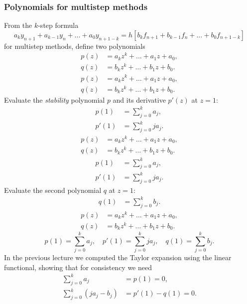 \documentclass{beamer}
\begin{document}
\begin{frame}
  \frametitle{Polynomials for multistep methods}

  \begin{overlayarea}{\textwidth}{0.9\textheight}
    {
      From the $k$-step formula
      \begin{equation*}
        a_k y_{n+1} + a_{k-1} y_n + \dots + a_0 y_{n+1-k} = h \left[ b_k
          f_{n+1} + b_{k-1} f_n + \dots + b_0 f_{n+1-k} \right]
      \end{equation*}
      for multistep methods, define two polynomials
      \begin{align*}
        p(z) & = a_k z^k + \dots + a_1 z + a_0, \\
        q(z) & = b_k z^k + \dots + b_1 z + b_0.
      \end{align*}
    }
    {
      \begin{align*}
        p(z) & = a_k z^k + \dots + a_1 z + a_0, \\
        q(z) & = b_k z^k + \dots + b_1 z + b_0.
      \end{align*}
      Evaluate the \emph{stability} polynomial $p$ and its
      derivative $p'(z)$ at $z=1$:
      \begin{align*}
        p(1) & = \sum_{j=0}^k a_j, \\
        p'(1) & = \sum_{j=0}^k j a_j.
      \end{align*}
    }
    {
      \begin{align*}
        p(z) & = a_k z^k + \dots + a_1 z + a_0, \\
        q(z) & = b_k z^k + \dots + b_1 z + b_0.
      \end{align*}
      \begin{align*}
        p(1) & = \sum_{j=0}^k a_j, \\
        p'(1) & = \sum_{j=0}^k j a_j.
      \end{align*}
      Evaluate the second polynomial $q$ at $z=1$:
      \begin{align*}
        q(1) & = \sum_{j=0}^k b_j.
      \end{align*}
    }
    {
      \begin{align*}
        p(z) & = a_k z^k + \dots + a_1 z + a_0, \\
        q(z) & = b_k z^k + \dots + b_1 z + b_0.
      \end{align*}
      \begin{equation*}
        p(1) = \sum_{j=0}^k a_j, \quad p'(1)  = \sum_{j=0}^k j a_j,
        \quad q(1) = \sum_{j=0}^k b_j.
      \end{equation*}
      In the previous lecture we computed the Taylor expansion using
      the linear functional, showing that for consistency we need
      \begin{align*}
        \sum_{j=0}^k a_j & = p(1) = 0, \\
        \sum_{j=0}^k (j a_j - b_j) & = p'(1) - q(1) = 0.
      \end{align*}
    }
  \end{overlayarea}

\end{frame}
\end{document}
